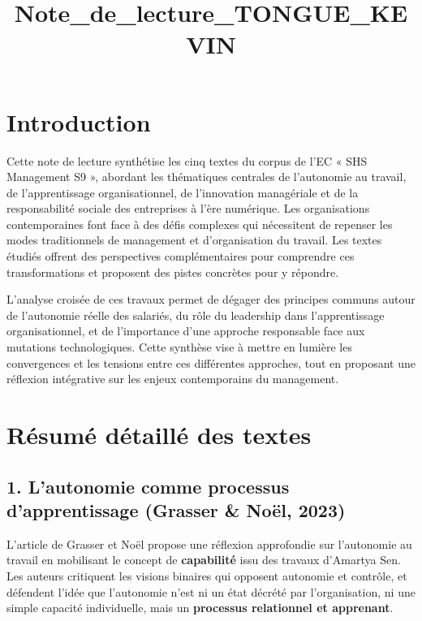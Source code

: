 \documentclass{rapportECL}
\title{Note_de_lecture_TONGUE_KEVIN} %
\begin{document}




\fairemarges
\fairepagedegarde
\tabledematieres


\section*{Introduction}

Cette note de lecture synthétise les cinq textes du corpus de l'EC « SHS Management S9 », abordant les thématiques centrales de l'autonomie au travail, de l'apprentissage organisationnel, de l'innovation managériale et de la responsabilité sociale des entreprises à l'ère numérique. Les organisations contemporaines font face à des défis complexes qui nécessitent de repenser les modes traditionnels de management et d'organisation du travail. Les textes étudiés offrent des perspectives complémentaires pour comprendre ces transformations et proposent des pistes concrètes pour y répondre.

L'analyse croisée de ces travaux permet de dégager des principes communs autour de l'autonomie réelle des salariés, du rôle du leadership dans l'apprentissage organisationnel, et de l'importance d'une approche responsable face aux mutations technologiques. Cette synthèse vise à mettre en lumière les convergences et les tensions entre ces différentes approches, tout en proposant une réflexion intégrative sur les enjeux contemporains du management.

\section*{Résumé détaillé des textes}

\subsection*{1. L'autonomie comme processus d'apprentissage (Grasser \& Noël, 2023)}

L'article de Grasser et Noël propose une réflexion approfondie sur l'autonomie au travail en mobilisant le concept de \textbf{capabilité} issu des travaux d'Amartya Sen. Les auteurs critiquent les visions binaires qui opposent autonomie et contrôle, et défendent l'idée que l'autonomie n'est ni un état décrété par l'organisation, ni une simple capacité individuelle, mais un \textbf{processus relationnel et apprenant}.
\end{document}
